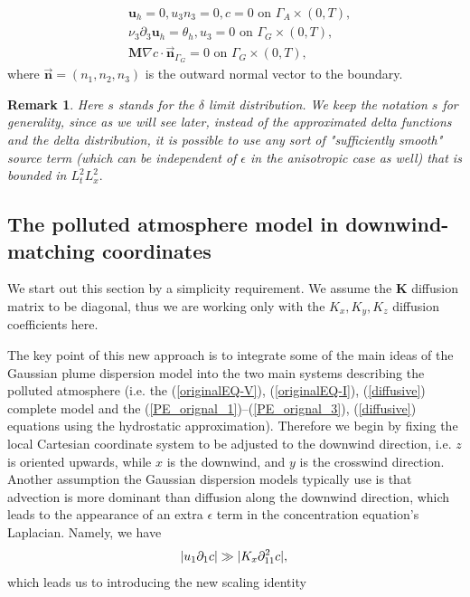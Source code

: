 \documentclass[12pt]{report}
\numberwithin{theorem}{chapter}
\numberwithin{corollary}{chapter}
\numberwithin{lemma}{chapter}
\newtheorem{remark}{Remark}
\numberwithin{remark}{chapter}
\numberwithin{definition}{chapter}
\numberwithin{prop}{chapter}
\begin{document}
\begin{equation} \label{HNSC_bc_coordinates_GFC_intro}
\begin{split}
& \mathbf{u}_h = 0, u_3 n_3 = 0, c = 0 \text{ on } \Gamma_A \times (0,T), \\
& \nu_3 \partial_3 \mathbf{u}_h = \theta_h, u_3 = 0 \text{ on } \Gamma_G \times (0,T), \\
& \mathbf{M} \nabla c \cdot \vec{\boldsymbol{n}}_{\Gamma_G} = 0 \text{ on } \Gamma_G \times (0,T),
\end{split}
\end{equation}
%
where $\vec{\boldsymbol{n}} = (n_1, n_2, n_3)$ is the outward normal vector to the boundary.

\begin{remark} \label{sourceregularityremark}
Here $s$ stands for the $\delta$ limit distribution. We keep the notation $s$ for generality, since as we will see later, instead of the approximated delta functions and the delta distribution, it is possible to use any sort of "sufficiently smooth" source term (which can be independent of $\epsilon$ in the anisotropic case as well) that is bounded in $L^2_t L^2_x.$
\end{remark}


\subsection{The polluted atmosphere model in downwind-matching coordinates} \label{eqsdescribingatmpluspollution_dwmc}

We start out this section by a simplicity requirement. We assume the $\mathbf{K}$ diffusion matrix to be diagonal, thus we are working only with the $K_x, K_y, K_z$ diffusion coefficients here.

The key point of this new approach is to integrate some of the main ideas of the Gaussian plume dispersion model into the two main systems describing the polluted atmosphere (i.e. the (\ref{originalEQ-V}), (\ref{originalEQ-I}), (\ref{diffusive}) complete model and the (\ref{PE_orignal_1})--(\ref{PE_orignal_3}), (\ref{diffusive}) equations using the hydrostatic approximation). Therefore we begin by fixing the local Cartesian coordinate system to be adjusted to the downwind direction, i.e. $z$ is oriented upwards, while $x$ is the downwind, and $y$ is the crosswind direction. Another assumption the Gaussian dispersion models typically use is that advection is more dominant than diffusion along the downwind direction, which leads to the appearance of an extra $\epsilon$ term in the concentration equation's Laplacian. Namely, we have
%
\begin{equation} \abs{u_1 \partial_{1} c} \gg | K_x \partial_{11} ^2 c | ,\end{equation}
%
which leads us to introducing the new scaling identity
\end{document}
